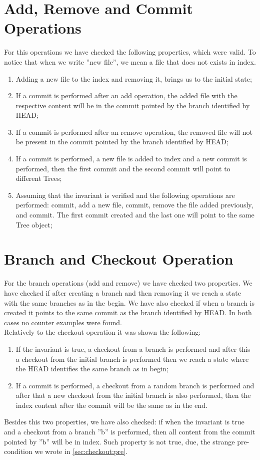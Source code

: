 \section{Add, Remove and Commit Operations}
For this operations we have checked the following properties, which
were valid. To notice that when we write ''new file'', we mean a file
that does not exists in index.
\begin{enumerate}
   \item Adding a new file to the index and removing it, brings us to the
   initial state;
   \item If a commit is performed after an add operation, the added
   file with the respective content will be in the commit pointed 
   by the branch identified by HEAD;
   \item If a commit is performed after an remove operation, the
   removed file will not be present in the commit pointed by the
   branch identified by HEAD;
   \item If a commit is performed, a new file is added to index and a
   new commit is performed, then the first commit and the second
   commit will point to different Trees;
   \item Assuming that the invariant is verified and the following operations are
   performed: commit, add a new file, commit, remove the file added
   previously, and commit. The first commit created and the last one
   will point to the same Tree object;
\end{enumerate}


\section{Branch and Checkout Operation}
For the branch operations (add and remove) we have checked two
properties. We have checked if after creating a branch and then
removing it we reach a state with the same branches as in the begin.
We have also checked if when a branch is created it points to the same
commit as the branch identified by HEAD. In both cases no counter
examples were found.\\

Relatively to the checkout operation it was shown the following:
\begin{enumerate}
   \item If the invariant is true, a checkout from a branch is
   performed and after this a checkout from the initial branch is
   performed then we reach a state where the HEAD identifies the same
   branch as in begin;
   \item If a commit is performed, a checkout from a random branch is
   performed and after that a new checkout from the initial branch is also
   performed, then the index content after the commit will be the same
   as in the end.
\end{enumerate}

Besides this two properties, we have also checked: if when the invariant is
true and a checkout from a branch ''b'' is performed, then all content
from the commit pointed by ''b'' will be in index. Such property is
not true, due, the strange pre-condition we wrote in
\ref{sec:checkout:pre}.

